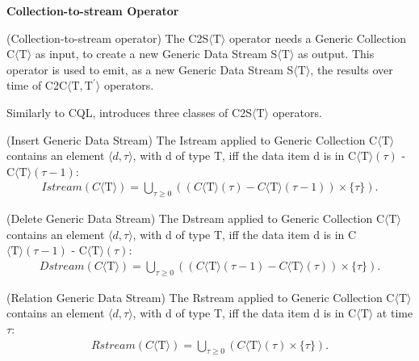 \pagebreak

\medskip
\noindent
\textbf{Collection-to-stream Operator}
\medskip

\begin{Definition}
(Collection-to-stream operator) The C2S$\langle\mathrm{T}\rangle$ operator needs a Generic Collection C$\langle\mathrm{T}\rangle$ as input, to create a new Generic Data Stream S$\langle\mathrm{T}\rangle$ as output. 
This operator is used to emit, as a new Generic Data Stream S$\langle\mathrm{T}\rangle$, the results over time of C2C$\langle\mathrm{T},\mathrm{T^{\prime}}\rangle$ operators. 
\end{Definition}

Similarly to CQL, \river{} introduces three classes of C2S$\langle\mathrm{T}\rangle$ operators.

\begin{Definition}
(Insert Generic Data Stream) The Istream applied to Generic Collection C$\langle\mathrm{T}\rangle$ contains an element $\langle d,\tau \rangle$, with d of type $\mathrm{T}$, iff the data item d is in C$\langle\mathrm{T}\rangle(\tau)$ - C$\langle\mathrm{T}\rangle(\tau - 1)$: 
\noindent\begin{align*}
Istream(C\langle\mathrm{T}\rangle) = \bigcup_{\tau \geq 0} ((C\langle\mathrm{T}\rangle(\tau) - C\langle\mathrm{T}\rangle(\tau - 1)) \times \{\tau\}).
\end{align*} 
\end{Definition}

\begin{Definition}
(Delete Generic Data Stream) The Dstream applied to Generic Collection C$\langle\mathrm{T}\rangle$ contains an element $\langle d,\tau \rangle$, with d of type $\mathrm{T}$, iff the data item d is in C$\langle\mathrm{T}\rangle(\tau - 1)$ - C$\langle\mathrm{T}\rangle(\tau)$: 
\noindent\begin{align*}
Dstream(C\langle\mathrm{T}\rangle) = \bigcup_{\tau \geq 0} ((C\langle\mathrm{T}\rangle(\tau - 1) - C\langle\mathrm{T}\rangle(\tau)) \times \{\tau\}).
\end{align*} 
\end{Definition}

\begin{Definition}
(Relation Generic Data Stream) The Rstream applied to Generic Collection C$\langle\mathrm{T}\rangle$ contains an element $\langle d,\tau \rangle$, with d of type $\mathrm{T}$, iff the data item d is in C$\langle\mathrm{T}\rangle$ at time $\tau$: 
\noindent\begin{align*}
Rstream(C\langle\mathrm{T}\rangle) = \bigcup_{\tau \geq 0} (C\langle\mathrm{T}\rangle(\tau) \times \{\tau\}).
\end{align*} 
\end{Definition}

